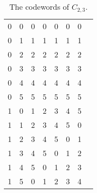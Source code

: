 \begin{table}[!htp]\centering
\begin{tabular}{lrrrrrrr}\toprule
0 &0 &0 &0 &0 &0 &0 \\
0 &1 &1 &1 &1 &1 &1 \\
0 &2 &2 &2 &2 &2 &2 \\
0 &3 &3 &3 &3 &3 &3 \\
0 &4 &4 &4 &4 &4 &4 \\
0 &5 &5 &5 &5 &5 &5 \\
1 &0 &1 &2 &3 &4 &5 \\
1 &1 &2 &3 &4 &5 &0 \\
1 &2 &3 &4 &5 &0 &1 \\
1 &3 &4 &5 &0 &1 &2 \\
1 &4 &5 &0 &1 &2 &3 \\
1 &5 &0 &1 &2 &3 &4 \\
\bottomrule
\end{tabular}
\caption{The codewords of $C_{2,3}$.}
\label{table:codewords}
\end{table}
